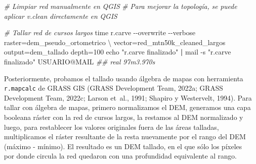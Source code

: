 \documentclass[spanish]{article}
\newenvironment{Shaded}{\begin{snugshade}}{\end{snugshade}}
\newcommand{\AttributeTok}[1]{\textcolor[rgb]{0.77,0.63,0.00}{#1}}
\newcommand{\BuiltInTok}[1]{#1}
\newcommand{\CommentTok}[1]{\textcolor[rgb]{0.56,0.35,0.01}{\textit{#1}}}
\newcommand{\DataTypeTok}[1]{\textcolor[rgb]{0.13,0.29,0.53}{#1}}
\newcommand{\ExtensionTok}[1]{#1}
\newcommand{\KeywordTok}[1]{\textcolor[rgb]{0.13,0.29,0.53}{\textbf{#1}}}
\newcommand{\NormalTok}[1]{#1}
\newcommand{\StringTok}[1]{\textcolor[rgb]{0.31,0.60,0.02}{#1}}
\begin{document}
\begin{Shaded}
\begin{Highlighting}[]
\CommentTok{\# Limpiar red manualmente en QGIS}
\CommentTok{\# Para mejorar la topología, se puede aplicar v.clean directamente en QGIS}

\CommentTok{\# Tallar red de cursos largos}
\BuiltInTok{time}\NormalTok{ r.carve }\AttributeTok{{-}{-}overwrite} \AttributeTok{{-}{-}verbose}\NormalTok{ raster=dem\_pseudo\_ortometrico }\DataTypeTok{\textbackslash{}}
\NormalTok{  vector=red\_mtn50k\_cleaned\_largos output=dem\_tallado depth=100}
\BuiltInTok{echo} \StringTok{"r.carve finalizado"} \KeywordTok{|} \ExtensionTok{mail} \AttributeTok{{-}s} \StringTok{"r.carve finalizado"}\NormalTok{ USUARIO@MAIL}
\CommentTok{\#\# real 97m3.970s}
\end{Highlighting}
\end{Shaded}

Posteriormente, probamos el tallado usando álgebra de mapas con
herramienta \texttt{r.mapcalc} de GRASS GIS (GRASS Development Team,
2022a; GRASS Development Team, 2022c; Larson et~al., 1991; Shapiro y
Westervelt, 1994). Para tallar con álgebra de mapas, primero
normalizamos el DEM, generamos una capa booleana ráster con la red de
cursos largos, la restamos al DEM normalizado y luego, para restablecer
los valores originales fuera de las áreas talladas, multiplicamos el
ráster resultante de la resta nuevamente por el rango del DEM (máximo -
mínimo). El resultado es un DEM tallado, en el que sólo los píxeles por
donde circula la red quedaron con una profundidad equivalente al rango.
\end{document}
